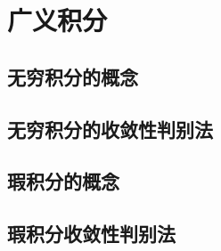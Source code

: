

\chapter{广义积分}\label{ch:10}
\section{无穷积分的概念}
\begin{exercise}

\end{exercise}
\section{无穷积分的收敛性判别法}
\begin{exercise}

\end{exercise}
\section{瑕积分的概念}
\begin{exercise}

\end{exercise}
\section{瑕积分收敛性判别法}
\begin{exercise}

\end{exercise}
\begin{exercise*}

\end{exercise*}




\endinput
